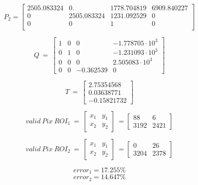 \begin{equation}\label{eq::P2}
P_2 = \begin{bmatrix}
2505.083324 &    0.       & 1778.704819 & 6909.840227\\
 0          & 2505.083324 & 1231.092529 &    0        \\
 0          &    0        &    1        &    0         \\
\end{bmatrix}
\end{equation}

\begin{equation}\label{eq::Q}
Q\ =\ \begin{bmatrix}
1 & 0 & 0 & -1.778705\cdot10^3\\
0 & 1 & 0 & -1.231093\cdot10^3\\
0 & 0 & 0 & 2.505083\cdot10^3\\
0 & 0 & -0.362539 & 0
\end{bmatrix}
\end{equation}

\begin{equation}\label{eq::T}
T\ =\ \begin{bmatrix}
2.75354568\\
0.03638771\\
-0.15821732
\end{bmatrix}
\end{equation}

\begin{equation}\label{eq::validpix1}
valid\ Pix\ ROI_1\ =\ 
\begin{bmatrix}
x_1 & y_1\\
x_2 & y_2
\end{bmatrix}\ =
\begin{bmatrix}
88 & 6\\
3192 & 2421
\end{bmatrix}
\end{equation}

\begin{equation}\label{eq::validpix2}
valid\ Pix\ ROI_2\ =\ 
\begin{bmatrix}
x_1 & y_1\\
x_2 & y_2
\end{bmatrix}\ =
\begin{bmatrix}
0 & 26\\
3204 & 2378
\end{bmatrix}
\end{equation}

\begin{equation}\label{eq::error1}
error_1 = 17.255\%
\end{equation}
\begin{equation}\label{eq::error2}
error_2 = 14.647\%
\end{equation}


